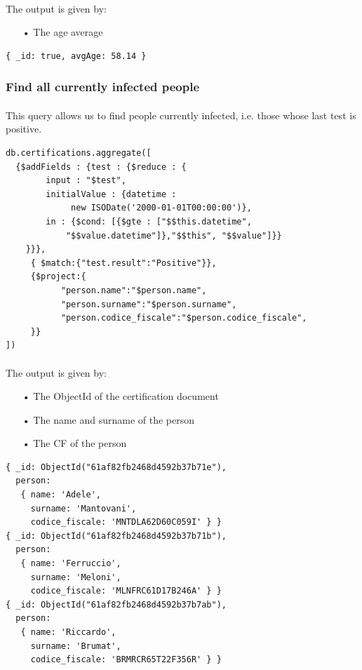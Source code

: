 \documentclass[a4paper,12pt]{article}
\begin{document}
\paragraph{} The output is given by: 
\begin{itemize}
\item[•] The age average
\end{itemize}
\begin{tcolorbox}[colback=red!5!white,colframe=red!75!black,title=OUTPUT]
\begin{verbatim}
{ _id: true, avgAge: 58.14 }
\end{verbatim}
\end{tcolorbox}

\subsubsection{Find all currently infected people}
\paragraph{} This query allows us to find people currently infected, i.e. those whose last test is positive.
\begin{tcolorbox}[colback=green!5!white,colframe=green!75!black,title=QUERY]
\begin{verbatim}
db.certifications.aggregate([
  {$addFields : {test : {$reduce : {
        input : "$test", 
        initialValue : {datetime : 
             new ISODate('2000-01-01T00:00:00')}, 
        in : {$cond: [{$gte : ["$$this.datetime", 
            "$$value.datetime"]},"$$this", "$$value"]}}
    }}},
     { $match:{"test.result":"Positive"}},
     {$project:{
           "person.name":"$person.name",
           "person.surname":"$person.surname",
           "person.codice_fiscale":"$person.codice_fiscale",
     }}
])
\end{verbatim}
\end{tcolorbox}
\paragraph{} The output is given by: 
\begin{itemize}[noitemsep]
\item[•] The ObjectId of the certification document
\item[•] The name and surname of the person
\item[•] The CF of the person
\end{itemize}
\begin{tcolorbox}[colback=red!5!white,colframe=red!75!black,title=OUTPUT]
\begin{verbatim}
{ _id: ObjectId("61af82fb2468d4592b37b71e"),
  person: 
   { name: 'Adele',
     surname: 'Mantovani',
     codice_fiscale: 'MNTDLA62D60C059I' } }
{ _id: ObjectId("61af82fb2468d4592b37b71b"),
  person: 
   { name: 'Ferruccio',
     surname: 'Meloni',
     codice_fiscale: 'MLNFRC61D17B246A' } }
{ _id: ObjectId("61af82fb2468d4592b37b7ab"),
  person: 
   { name: 'Riccardo',
     surname: 'Brumat',
     codice_fiscale: 'BRMRCR65T22F356R' } }
\end{verbatim}
\end{tcolorbox}
\end{document}
